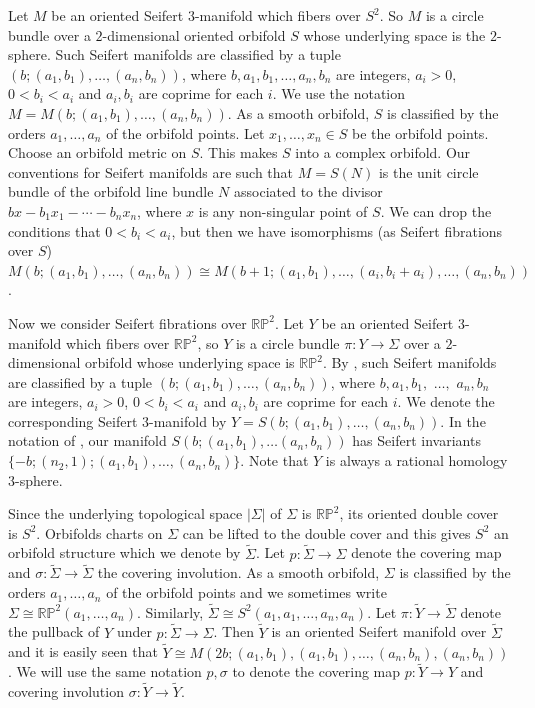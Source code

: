 \documentclass{amsart}
\theoremstyle{definition}
\theoremstyle{remark}
\numberwithin{equation}{section}
\begin{document}
Let $M$ be an oriented Seifert $3$-manifold which fibers over $S^2$. So $M$ is a circle bundle over a $2$-dimensional oriented orbifold $S$ whose underlying space is the $2$-sphere. Such Seifert manifolds are classified by a tuple $(b ; (a_1,b_1) , \dots , (a_n,b_n))$, where $b,a_1,b_1, \dots , a_n,b_n$ are integers, $a_i > 0$, $0 < b_i < a_i$ and $a_i,b_i$ are coprime for each $i$. We use the notation $M = M(b ; (a_1, b_1) , \dots , (a_n,b_n))$. As a smooth orbifold, $S$ is classified by the orders $a_1, \dots , a_n$ of the orbifold points. Let $x_1, \dots , x_n \in S$ be the orbifold points. Choose an orbifold metric on $S$. This makes $S$ into a complex orbifold. Our conventions for Seifert manifolds are such that $M = S(N)$ is the unit circle bundle of the orbifold line bundle $N$ associated to the divisor $bx - b_1 x_1 - \cdots - b_n x_n$, where $x$ is any non-singular point of $S$. We can drop the conditions that $0 < b_i < a_i$, but then we have isomorphisms (as Seifert fibrations over $S$) $M(b ; (a_1,b_1) , \dots , (a_n,b_n)) \cong M(b+1 ; (a_1, b_1) , \dots , (a_i , b_i + a_i) , \dots , (a_n,b_n))$. 

Now we consider Seifert fibrations over $\mathbb{RP}^2$. Let $Y$ be an oriented Seifert $3$-manifold which fibers over $\mathbb{RP}^2$, so $Y$ is a circle bundle $\pi : Y \to \Sigma$ over a $2$-dimensional orbifold whose underlying space is $\mathbb{RP}^2$. By \cite[Theorem 2, ]{or}, such Seifert manifolds are classified by a tuple $(b ; (a_1, b_1) , \dots , (a_n , b_n) )$, where $b,a_1,b_1,$ $ \dots ,$ $a_n,b_n$ are integers, $a_i > 0$, $0 < b_i < a_i$ and $a_i,b_i$ are coprime for each $i$. We denote the corresponding Seifert $3$-manifold by $Y = S( b ; (a_1,b_1) , \dots , (a_n,b_n))$. In the notation of \cite{or}, our manifold $S(b ; (a_1,b_1) , \dots (a_n,b_n))$ has Seifert invariants $\{ -b ; (n_2 , 1) ; (a_1 , b_1) , \dots , (a_n , b_n) \}$. Note that $Y$ is always a rational homology $3$-sphere.

Since the underlying topological space $|\Sigma|$ of $\Sigma$ is $\mathbb{RP}^2$, its oriented double cover is $S^2$. Orbifolds charts on $\Sigma$ can be lifted to the double cover and this gives $S^2$ an orbifold structure which we denote by $\widetilde{\Sigma}$. Let $p : \widetilde{\Sigma} \to \Sigma$ denote the covering map and $\sigma : \widetilde{\Sigma} \to \widetilde{\Sigma}$ the covering involution. As a smooth orbifold, $\Sigma$ is classified by the orders $a_1, \dots , a_n$ of the orbifold points and we sometimes write $\Sigma \cong \mathbb{RP}^2(a_1 , \dots , a_n)$. Similarly, $\widetilde{\Sigma} \cong S^2(a_1,a_1, \dots , a_n , a_n)$. Let $\pi : \widetilde{Y} \to \widetilde{\Sigma}$ denote the pullback of $Y$ under $p : \widetilde{\Sigma} \to \Sigma$. Then $\widetilde{Y}$ is an oriented Seifert manifold over $\widetilde{\Sigma}$ and it is easily seen that $\widetilde{Y} \cong M( 2b ; (a_1 , b_1) , (a_1 , b_1) , \dots , (a_n , b_n) , (a_n , b_n))$. We will use the same notation $p,\sigma$ to denote the covering map $p : \widetilde{Y} \to Y$ and covering involution $\sigma : \widetilde{Y} \to \widetilde{Y}$.
\end{document}
